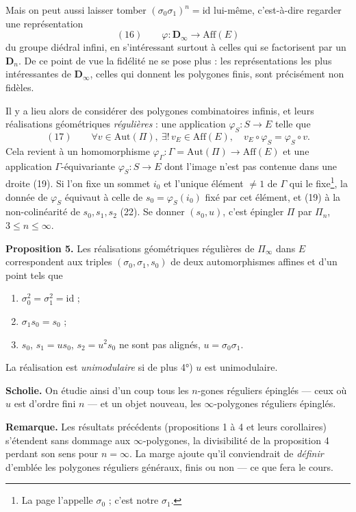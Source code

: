 \documentclass[11pt,a4paper]{article}
\begin{document}
Mais on peut aussi laisser tomber $(\sigma_0\sigma_1)^n = \mathrm{id}$
lui-même, c'est-à-dire regarder une représentation
\[
  (16) \qquad \varphi : \mathbf{D}_\infty \longrightarrow \mathrm{Aff}(E)
\]
du groupe diédral infini, en s'intéressant surtout à celles qui se factorisent
par un $\mathbf{D}_n$. De ce point de vue la fidélité ne se pose plus : les
représentations les plus intéressantes de $\mathbf{D}_\infty$, celles qui
donnent les polygones finis, sont précisément non fidèles.

Il y a lieu alors de considérer des polygones combinatoires infinis, et leurs
réalisations géométriques \emph{régulières} : une application $\varphi_S : S
\to E$ telle que
\[
  (17) \qquad \forall v \in \mathrm{Aut}(\Pi),\ \exists!\, v_E \in
  \mathrm{Aff}(E),\quad v_E \circ \varphi_S = \varphi_S \circ v .
\]
Cela revient à un homomorphisme $\varphi_\Gamma : \Gamma = \mathrm{Aut}(\Pi)
\to \mathrm{Aff}(E)$ et une application $\Gamma$-équivariante $\varphi_S : S
\to E$ dont l'image n'est pas contenue dans une droite (19). Si l'on fixe un
sommet $i_0$ et l'unique élément $\neq 1$ de $\Gamma$ qui le fixe\footnote{La
page l'appelle $\sigma_0$ ; c'est notre $\sigma_1$.}, la donnée de
$\varphi_S$ équivaut à celle de $s_0 = \varphi_S(i_0)$ fixé par cet élément,
et (19) à la non-colinéarité de $s_0, s_1, s_2$ (22). Se donner $(s_0, u)$,
c'est épingler $\Pi$ par $\Pi_n$, $3 \leq n \leq \infty$.

\textbf{Proposition 5.} Les réalisations géométriques régulières de
$\Pi_\infty$ dans $E$ correspondent aux triples $(\sigma_0, \sigma_1, s_0)$ de
deux automorphismes affines et d'un point tels que
\begin{enumerate}
  \item[1°)] $\sigma_0^2 = \sigma_1^2 = \mathrm{id}$ ;
  \item[2°)] $\sigma_1 s_0 = s_0$ ;
  \item[3°)] $s_0$, $s_1 = u s_0$, $s_2 = u^2 s_0$ ne sont pas alignés,
    $u = \sigma_0 \sigma_1$.
\end{enumerate}
La réalisation est \emph{unimodulaire} si de plus 4°) $u$ est unimodulaire.

\textbf{Scholie.} On étudie ainsi d'un coup tous les $n$-gones réguliers
épinglés --- ceux où $u$ est d'ordre fini $n$ --- et un objet nouveau, les
$\infty$-polygones réguliers épinglés.

\textbf{Remarque.} Les résultats précédents (propositions 1 à 4 et leurs
corollaires) s'étendent sans dommage aux $\infty$-polygones, la divisibilité
de la proposition 4 perdant son sens pour $n = \infty$. La marge ajoute qu'il
conviendrait de \emph{définir} d'emblée les polygones réguliers généraux,
finis ou non --- ce que fera le cours.
\end{document}
